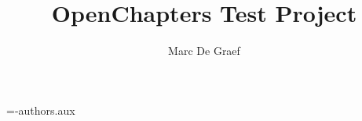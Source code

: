 \documentclass[11pt,fleqn,A4paper]{book}
\title{OpenChapters Test Project}
\author{Marc De Graef}
\begin{document}


\immediate\openout\authorfile=\jobname-authors.aux%






\end{document}
